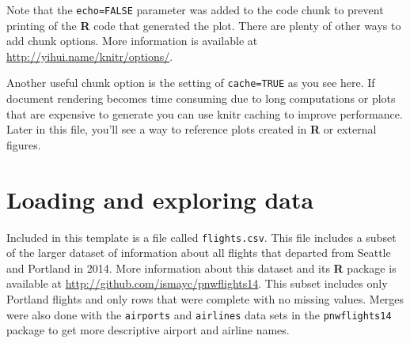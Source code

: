 \documentclass[12pt,twoside]{deuthesis}
\begin{document}
Note that the \texttt{echo=FALSE} parameter was added to the code chunk to prevent printing of the \textbf{R} code that generated the plot. There are plenty of other ways to add chunk options. More information is available at \url{http://yihui.name/knitr/options/}.

Another useful chunk option is the setting of \texttt{cache=TRUE} as you see here. If document rendering becomes time consuming due to long computations or plots that are expensive to generate you can use knitr caching to improve performance. Later in this file, you'll see a way to reference plots created in \textbf{R} or external figures.

\hypertarget{loading-and-exploring-data}{%
\section{Loading and exploring data}\label{loading-and-exploring-data}}

Included in this template is a file called \texttt{flights.csv}. This file includes a subset of the larger dataset of information about all flights that departed from Seattle and Portland in 2014. More information about this dataset and its \textbf{R} package is available at \url{http://github.com/ismayc/pnwflights14}. This subset includes only Portland flights and only rows that were complete with no missing values. Merges were also done with the \texttt{airports} and \texttt{airlines} data sets in the \texttt{pnwflights14} package to get more descriptive airport and airline names.
\end{document}
